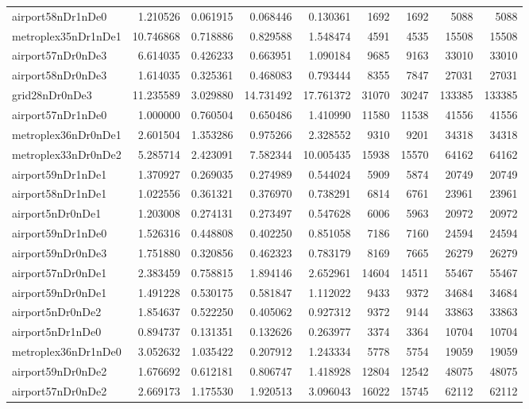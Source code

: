 \begin{longtable}{|l|r|r|r|r|r|r|r|r|}
airport58nDr1nDe0 & 1.210526 & 0.061915 & 0.068446 & 0.130361 & 1692 & 1692 & 5088 & 5088 \\
metroplex35nDr1nDe1 & 10.746868 & 0.718886 & 0.829588 & 1.548474 & 4591 & 4535 & 15508 & 15508 \\
airport57nDr0nDe3 & 6.614035 & 0.426233 & 0.663951 & 1.090184 & 9685 & 9163 & 33010 & 33010 \\
airport58nDr0nDe3 & 1.614035 & 0.325361 & 0.468083 & 0.793444 & 8355 & 7847 & 27031 & 27031 \\
grid28nDr0nDe3 & 11.235589 & 3.029880 & 14.731492 & 17.761372 & 31070 & 30247 & 133385 & 133385 \\
airport57nDr1nDe0 & 1.000000 & 0.760504 & 0.650486 & 1.410990 & 11580 & 11538 & 41556 & 41556 \\
metroplex36nDr0nDe1 & 2.601504 & 1.353286 & 0.975266 & 2.328552 & 9310 & 9201 & 34318 & 34318 \\
metroplex33nDr0nDe2 & 5.285714 & 2.423091 & 7.582344 & 10.005435 & 15938 & 15570 & 64162 & 64162 \\
airport59nDr1nDe1 & 1.370927 & 0.269035 & 0.274989 & 0.544024 & 5909 & 5874 & 20749 & 20749 \\
airport58nDr1nDe1 & 1.022556 & 0.361321 & 0.376970 & 0.738291 & 6814 & 6761 & 23961 & 23961 \\
airport5nDr0nDe1 & 1.203008 & 0.274131 & 0.273497 & 0.547628 & 6006 & 5963 & 20972 & 20972 \\
airport59nDr1nDe0 & 1.526316 & 0.448808 & 0.402250 & 0.851058 & 7186 & 7160 & 24594 & 24594 \\
airport59nDr0nDe3 & 1.751880 & 0.320856 & 0.462323 & 0.783179 & 8169 & 7665 & 26279 & 26279 \\
airport57nDr0nDe1 & 2.383459 & 0.758815 & 1.894146 & 2.652961 & 14604 & 14511 & 55467 & 55467 \\
airport59nDr0nDe1 & 1.491228 & 0.530175 & 0.581847 & 1.112022 & 9433 & 9372 & 34684 & 34684 \\
airport5nDr0nDe2 & 1.854637 & 0.522250 & 0.405062 & 0.927312 & 9372 & 9144 & 33863 & 33863 \\
airport5nDr1nDe0 & 0.894737 & 0.131351 & 0.132626 & 0.263977 & 3374 & 3364 & 10704 & 10704 \\
metroplex36nDr1nDe0 & 3.052632 & 1.035422 & 0.207912 & 1.243334 & 5778 & 5754 & 19059 & 19059 \\
airport59nDr0nDe2 & 1.676692 & 0.612181 & 0.806747 & 1.418928 & 12804 & 12542 & 48075 & 48075 \\
airport57nDr0nDe2 & 2.669173 & 1.175530 & 1.920513 & 3.096043 & 16022 & 15745 & 62112 & 62112 \\

\end{longtable}
